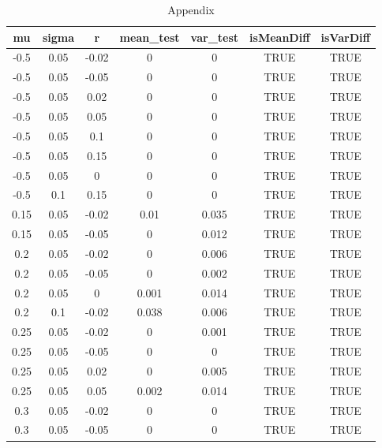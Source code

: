 \documentclass[
10pt, %
a4paper, %
oneside, %
headinclude,footinclude, %
BCOR5mm, %
]{scrartcl}
\begin{document}
\begin{table}[H]
	\centering
	\caption{Appendix}
	\label{my-label}
	\begin{tabular}{|c|c|c|c|c|c|c|}
		\hline
		mu    & sigma & r     & mean\_test & var\_test & isMeanDiff & isVarDiff \\
		\hline
		-0.5  & 0.05  & -0.02 & 0          & 0         & TRUE       & TRUE      \\
		-0.5  & 0.05  & -0.05 & 0          & 0         & TRUE       & TRUE      \\
		-0.5  & 0.05  & 0.02  & 0          & 0         & TRUE       & TRUE      \\
		-0.5  & 0.05  & 0.05  & 0          & 0         & TRUE       & TRUE      \\
		-0.5  & 0.05  & 0.1   & 0          & 0         & TRUE       & TRUE      \\
		-0.5  & 0.05  & 0.15  & 0          & 0         & TRUE       & TRUE      \\
		-0.5  & 0.05  & 0     & 0          & 0         & TRUE       & TRUE      \\
		-0.5  & 0.1   & 0.15  & 0          & 0         & TRUE       & TRUE      \\
		0.15  & 0.05  & -0.02 & 0.01       & 0.035     & TRUE       & TRUE      \\
		0.15  & 0.05  & -0.05 & 0          & 0.012     & TRUE       & TRUE      \\
		0.2   & 0.05  & -0.02 & 0          & 0.006     & TRUE       & TRUE      \\
		0.2   & 0.05  & -0.05 & 0          & 0.002     & TRUE       & TRUE      \\
		0.2   & 0.05  & 0     & 0.001      & 0.014     & TRUE       & TRUE      \\
		0.2   & 0.1   & -0.02 & 0.038      & 0.006     & TRUE       & TRUE      \\
		0.25  & 0.05  & -0.02 & 0          & 0.001     & TRUE       & TRUE      \\
		0.25  & 0.05  & -0.05 & 0          & 0         & TRUE       & TRUE      \\
		0.25  & 0.05  & 0.02  & 0          & 0.005     & TRUE       & TRUE      \\
		0.25  & 0.05  & 0.05  & 0.002      & 0.014     & TRUE       & TRUE      \\
		0.3   & 0.05  & -0.02 & 0          & 0         & TRUE       & TRUE      \\
		0.3   & 0.05  & -0.05 & 0          & 0         & TRUE       & TRUE      \\

\end{tabular}
\end{table}
\end{document}
